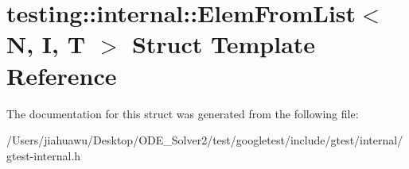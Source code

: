 \hypertarget{structtesting_1_1internal_1_1_elem_from_list}{}\section{testing\+:\+:internal\+:\+:Elem\+From\+List$<$ N, I, T $>$ Struct Template Reference}
\label{structtesting_1_1internal_1_1_elem_from_list}


The documentation for this struct was generated from the following file\+:\begin{DoxyCompactItemize}
\item 
/\+Users/jiahuawu/\+Desktop/\+O\+D\+E\+\_\+\+Solver2/test/googletest/include/gtest/internal/gtest-\/internal.\+h\end{DoxyCompactItemize}
